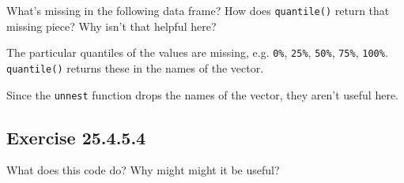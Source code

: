 \documentclass[]{book}
\newenvironment{Shaded}{\begin{snugshade}}{\end{snugshade}}
\newcommand{\CommentTok}[1]{\textcolor[rgb]{0.56,0.35,0.01}{\textit{#1}}}
\newcommand{\DataTypeTok}[1]{\textcolor[rgb]{0.13,0.29,0.53}{#1}}
\newcommand{\KeywordTok}[1]{\textcolor[rgb]{0.13,0.29,0.53}{\textbf{#1}}}
\newcommand{\NormalTok}[1]{#1}
\newcommand{\OperatorTok}[1]{\textcolor[rgb]{0.81,0.36,0.00}{\textbf{#1}}}
\newcommand{\StringTok}[1]{\textcolor[rgb]{0.31,0.60,0.02}{#1}}
\theoremstyle{plain}
\theoremstyle{remark}
\begin{document}
What's missing in the following data frame? How does \texttt{quantile()} return that missing piece? Why isn't that helpful here?

\begin{Shaded}
\end{Shaded}

The particular quantiles of the values are missing, e.g. \texttt{0\%}, \texttt{25\%}, \texttt{50\%}, \texttt{75\%}, \texttt{100\%}. \texttt{quantile()} returns these in the names of the vector.

\begin{Shaded}
\end{Shaded}

Since the \texttt{unnest} function drops the names of the vector, they aren't useful here.

\hypertarget{exercise-25.4.5.4}{%
\subsection*{\texorpdfstring{Exercise {25.4.5.4}}{Exercise 25.4.5.4}}\label{exercise-25.4.5.4}}

What does this code do?
Why might might it be useful?

\begin{Shaded}
\end{Shaded}
\end{document}
